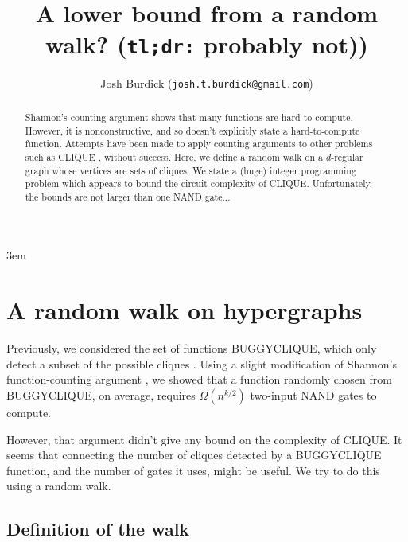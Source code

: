 \documentclass[12pt]{article}
\theoremstyle{definition}
\begin{document}
\emergencystretch 3em
\title{A lower bound from a random walk? ({\tt tl;dr:} probably not))}

\author{Josh Burdick ({\tt josh.t.burdick@gmail.com})}

\maketitle

\begin{abstract}

Shannon's counting argument \cite{shannon_synthesis_1949} shows that many functions are hard to compute.
However, it is nonconstructive, and so doesn't explicitly state a
hard-to-compute function. Attempts have been made to apply counting arguments to other problems
such as CLIQUE \cite{buggyclique}, without success.
Here, we define a random walk on a $d$-regular graph whose vertices are
sets of cliques. We state a (huge) integer programming
problem which appears to bound the circuit complexity of CLIQUE. Unfortunately,
the bounds are not larger than one NAND gate...
\end{abstract}

\newpage

\tableofcontents

\vspace{5mm}


\section{A random walk on hypergraphs} \label{se:countingBound}

Previously, we considered the set of functions BUGGYCLIQUE, which
only detect a subset of the possible cliques \cite{buggyclique}.
Using a slight modification of Shannon's
function-counting argument \cite{shannon_synthesis_1949},
we showed that a function randomly chosen from BUGGYCLIQUE,
on average, requires $\Omega(n^{k/2})$ two-input NAND gates to compute.

However, that argument didn't give any bound on the complexity of CLIQUE.
It seems that connecting the number of cliques detected by a BUGGYCLIQUE
function, and the number of gates it uses, might be useful. We try
to do this using a random walk.

\subsection{Definition of the walk}
\end{document}
